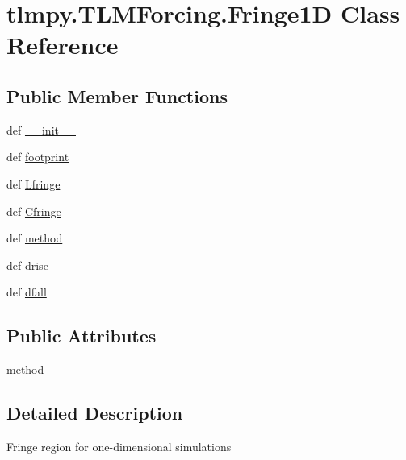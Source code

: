 \hypertarget{classtlmpy_1_1TLMForcing_1_1Fringe1D}{
\section{tlmpy.TLMForcing.Fringe1D Class Reference}
\label{classtlmpy_1_1TLMForcing_1_1Fringe1D}
}
\subsection*{Public Member Functions}
\begin{DoxyCompactItemize}
\item 
def \hyperlink{classtlmpy_1_1TLMForcing_1_1Fringe1D_ae20b94fe7734a51f0f0cc426e4f11ace}{\_\-\_\-init\_\-\_\-}
\item 
def \hyperlink{classtlmpy_1_1TLMForcing_1_1Fringe1D_a4568a76835f764c2e7c10fec879a04ac}{footprint}
\item 
def \hyperlink{classtlmpy_1_1TLMForcing_1_1Fringe1D_a4b760d0c54335a9c5f53d5e393084198}{Lfringe}
\item 
def \hyperlink{classtlmpy_1_1TLMForcing_1_1Fringe1D_a805f421e396801313108d97ddb9966e1}{Cfringe}
\item 
def \hyperlink{classtlmpy_1_1TLMForcing_1_1Fringe1D_a615590ffa3f72efb0c5002dd3c7c4194}{method}
\item 
def \hyperlink{classtlmpy_1_1TLMForcing_1_1Fringe1D_a861b9384e47d8828771f04c415edf551}{drise}
\item 
def \hyperlink{classtlmpy_1_1TLMForcing_1_1Fringe1D_a8492efa38c4a195f9b80e8ecc3c32a81}{dfall}
\end{DoxyCompactItemize}
\subsection*{Public Attributes}
\begin{DoxyCompactItemize}
\item 
\hyperlink{classtlmpy_1_1TLMForcing_1_1Fringe1D_ae3c921a1946098bf6167cd15f9bbdaf9}{method}
\end{DoxyCompactItemize}


\subsection{Detailed Description}
\begin{DoxyVerb}
Fringe region for one-dimensional simulations
\end{DoxyVerb}
 

